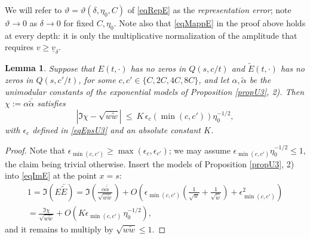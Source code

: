 \documentclass[11pt,twoside,reqno]{amsart}
\def\ti{\tilde}
\def\to{\rightarrow}
\def\d{\delta}
\def\a{\alpha}
\def\uv{\underline{v}_{\d}}
\theoremstyle{plain}
\newtheorem{lemma}{Lemma}
\numberwithin{equation}{section}
\begin{document}
We will refer to $\vartheta=\vartheta(\d,\eta_0,C)$ of \eqref{eqRepE} as the {\it representation error}; note $\vartheta\to0$ as $\d\to0$ for fixed $C,\eta_0$. Note also that \eqref{eqMappE} in the proof above holds at every depth: it is only the multiplicative normalization of the amplitude that requires $v\geq\uv$.

\begin{lemma}\label{lemChi}
Suppose that $E(t,\cdot)$ has no zeros in $Q(s,c/t)$ and $\ti E(t,\cdot)$ has no zeros in $Q(s,c'/t)$, for some $c,c'\in\{C,2C,4C,8C\}$, and let $\a,\ti\a$ be the unimodular constants of the exponential models of Proposition \ref{propU3}, 2). Then $\chi:=\a\bar{\ti\a}$ satisfies
$$\left|\Im\chi-\sqrt{w\ti w}\right|\ \leq\ K\,\epsilon_c\!\left(\min(c,c')\right)\eta_0^{-1/2},$$
with $\epsilon_c$ defined in \eqref{eqEpsU3} and an absolute constant $K$.
\end{lemma}

\begin{proof}
Note that $\epsilon_{\min(c,c')}\geq\max\left(\epsilon_c,\epsilon_{c'}\right)$; we may assume $\epsilon_{\min(c,c')}\eta_0^{-1/2}\leq1$, the claim being trivial otherwise. Insert the models of Proposition \ref{propU3}, 2) into \eqref{eqImE} at the point $x=s$:
$$\begin{gathered}1=\Im\left(E\bar{\ti E}\right)=\Im\left(\frac{\a\bar{\ti\a}}{\sqrt{w\ti w}}\right)+O\left(\epsilon_{\min(c,c')}\left(\frac1{\sqrt w}+\frac1{\sqrt{\ti w}}\right)+\epsilon_{\min(c,c')}^2\right)\\
=\frac{\Im\chi}{\sqrt{w\ti w}}+O\left(K\epsilon_{\min(c,c')}\,\eta_0^{-1/2}\right),\end{gathered}$$
and it remains to multiply by $\sqrt{w\ti w}\leq1$.
\end{proof}
\end{document}
